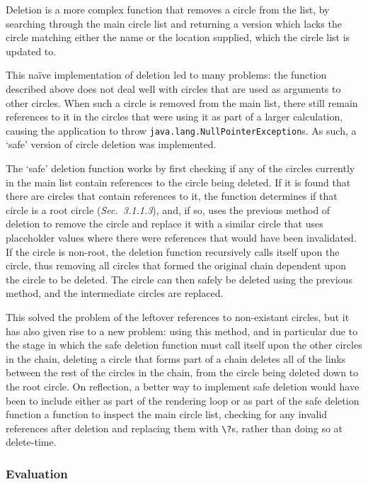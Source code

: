 \documentclass[12pt,twoside,notitlepage,xetex]{report}
\begin{document}
Deletion is a more complex function that removes a circle from the list, by searching through the main circle list and returning a version which lacks the circle matching either the name or the location supplied, which the circle list is updated to.

This naïve implementation of deletion led to many problems: the function described above does not deal well with circles that are used as arguments to other circles.  When such a circle is removed from the main list, there still remain references to it in the circles that were using it as part of a larger calculation, causing the application to throw \verb¬java.lang.NullPointerException¬s.  As such, a `safe' version of circle deletion was implemented.

The `safe' deletion function works by first checking if any of the circles currently in the main list contain references to the circle being deleted.  If it is found that there are circles that contain references to it, the function determines if that circle is a root circle (\emph{Sec.~3.1.1.3}), and, if so, uses the previous method of deletion to remove the circle and replace it with a similar circle that uses placeholder values where there were references that would have been invalidated.  If the circle is non-root, the deletion function recursively calls itself upon the circle, thus removing all circles that formed the original chain dependent upon the circle to be deleted.  The circle can then safely be deleted using the previous method, and the intermediate circles are replaced.

This solved the problem of the leftover references to non-existant circles, but it has also given rise to a new problem: using this method, and in particular due to the stage in which the safe deletion function must call itself upon the other circles in the chain, deleting a circle that forms part of a chain deletes all of the links between the rest of the circles in the chain, from the circle being deleted down to the root circle.  On reflection, a better way to implement safe deletion would have been to include either as part of the rendering loop or as part of the safe deletion function a function to inspect the main circle list, checking for any invalid references after deletion and replacing them with \verb¬\?¬s, rather than doing so at delete-time.

\subsubsection{Evaluation}
\end{document}
